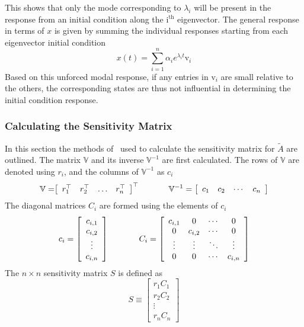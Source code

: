 This shows that only the mode corresponding to $\lambda_{i}$ will be present in the response from an initial condition along the $\mathrm{i^{th}}$ eigenvector.
The general response in terms of $x$ is given by summing the individual responses starting from each eigenvector initial condition
\begin{equation*}
  x(t)=\sum \limits_{i=1}^{n} \alpha_{i}e^{\lambda_{i}t}\mathrm{v}_{i}
\end{equation*}
Based on this unforced modal response, if any entries in $\mathrm{v}_{i}$ are small relative to the others, the corresponding states are thus not influential in determining the initial condition response.

\subsubsection*{Calculating the Sensitivity Matrix}

In this section the methods of\ \cite{manual.durham.2002} used to calculate the sensitivity matrix for $\tilde{A}$ are outlined.
The matrix $\mathbb{V}$ and its inverse $\mathbb{V}^{-1}$ are first calculated.
The rows of $\mathbb{V}$ are denoted using $r_{i}$, and the columns of $\mathbb{V}^{-1}$ as $c_{i}$
\begin{equation*}
  \mathbb{V}=
  \bigr[
  \begin{array}{cccc}
    r_{1}^{\top} & r_{2}^{\top} & \hdots & r_{n} ^{\top}
  \end{array}\bigr]^{\top}
  \hspace{0.5in}
  \mathbb{V}^{-1}=\left[
  \begin{array}{cccc}
    c_{1} & c_{2} & \cdots & c_{n}
  \end{array}\right]
\end{equation*}
The diagonal matrices $C_{i}$ are formed using the elements of $c_{i}$
\begin{equation*}
  c_{i}=\left[
  \begin{array}{c}
    c_{i,1} \\
    c_{i,2} \\
    \vdots \\
    c_{i,n}
  \end{array}\right] \hspace{0.5in}
  C_{i}=\left[
  \begin{array}{cccc}
  c_{i,1} & 0 & \cdots & 0 \\
  0 & c_{i,2} & \cdots & 0 \\
  \vdots & \vdots & \ddots & \vdots \\
  0 & 0 & \cdots & c_{i,n}
  \end{array}\right]
\end{equation*}
The $n \times n$ sensitivity matrix $S$ is defined as
\begin{equation*}
  S\equiv\left[
  \begin{array}{c}
    r_{1}C_{1} \\
    r_{2}C_{2} \\
    \vdots \\
    r_{n}C_{n}
  \end{array}\right]
\end{equation*}

